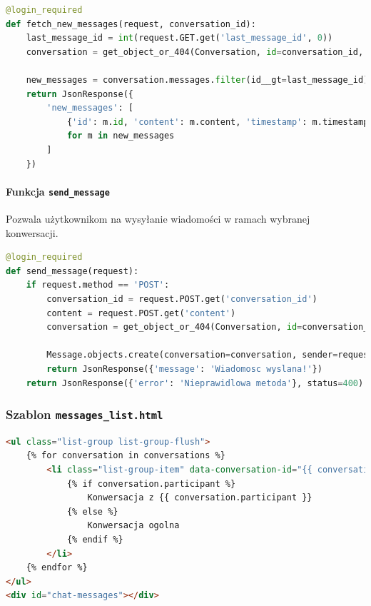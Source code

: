 \documentclass[12pt,a4paper,oneside]{article}
\theoremstyle{definition}
\numberwithin{equation}{section}
\begin{document}
\begin{lstlisting}[language=Python, caption=Funkcja \texttt{fetch\_new\_messages}]
@login_required
def fetch_new_messages(request, conversation_id):
    last_message_id = int(request.GET.get('last_message_id', 0))
    conversation = get_object_or_404(Conversation, id=conversation_id, participants=request.user)

    new_messages = conversation.messages.filter(id__gt=last_message_id).order_by('timestamp')
    return JsonResponse({
        'new_messages': [
            {'id': m.id, 'content': m.content, 'timestamp': m.timestamp.strftime('%H:%M'), 'sender': m.sender.username}
            for m in new_messages
        ]
    })
\end{lstlisting}



\paragraph{Funkcja \texttt{send\_message}}
Pozwala użytkownikom na wysyłanie wiadomości w ramach wybranej konwersacji.

\begin{lstlisting}[language=Python, caption=Funkcja \texttt{send\_message}]
@login_required
def send_message(request):
    if request.method == 'POST':
        conversation_id = request.POST.get('conversation_id')
        content = request.POST.get('content')
        conversation = get_object_or_404(Conversation, id=conversation_id, participants=request.user)

        Message.objects.create(conversation=conversation, sender=request.user, content=content.strip())
        return JsonResponse({'message': 'Wiadomosc wyslana!'})
    return JsonResponse({'error': 'Nieprawidlowa metoda'}, status=400)
\end{lstlisting}



\subsubsection{Szablon \texttt{messages\_list.html}}

\begin{lstlisting}[language=HTML, caption=Szablon \texttt{messages\_list.html}]
<ul class="list-group list-group-flush">
    {% for conversation in conversations %}
        <li class="list-group-item" data-conversation-id="{{ conversation.id }}">
            {% if conversation.participant %}
                Konwersacja z {{ conversation.participant }}
            {% else %}
                Konwersacja ogolna
            {% endif %}
        </li>
    {% endfor %}
</ul>
<div id="chat-messages"></div>
\end{lstlisting}
\end{document}

